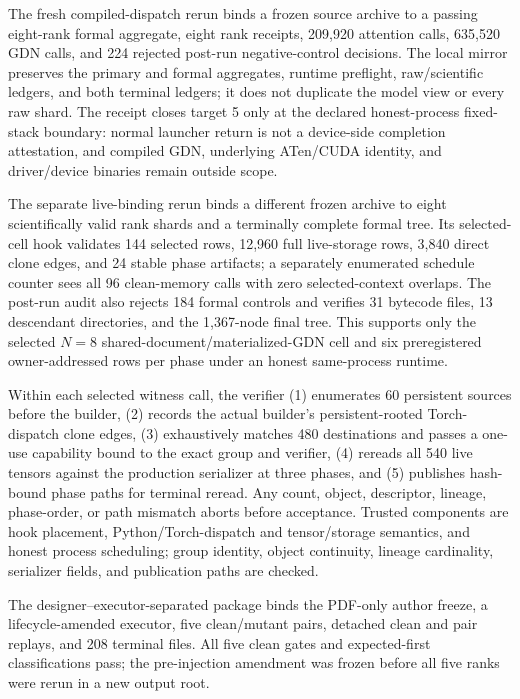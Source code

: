 \documentclass{article}
\begin{document}
The fresh compiled-dispatch rerun binds a frozen source archive to a passing
eight-rank formal aggregate, eight rank receipts, 209,920 attention calls,
635,520 GDN calls, and 224 rejected post-run negative-control decisions.  The
local mirror preserves the primary and formal aggregates, runtime preflight,
raw/scientific ledgers, and both terminal ledgers; it does not duplicate the
model view or every raw shard.  The receipt closes target 5 only at the
declared honest-process fixed-stack boundary: normal launcher return is not a
device-side completion attestation, and compiled GDN, underlying ATen/CUDA
identity, and driver/device binaries remain outside scope.

The separate live-binding rerun binds a different frozen archive to eight
scientifically valid rank shards and a terminally complete formal tree.  Its
selected-cell hook validates 144 selected rows, 12,960 full live-storage rows,
3,840 direct clone edges, and 24 stable phase artifacts; a separately enumerated
schedule counter sees all 96 clean-memory calls with zero selected-context
overlaps.  The
post-run audit also rejects 184 formal controls and verifies 31 bytecode files,
13 descendant directories, and the 1,367-node final tree.  This supports only
the selected $N=8$ shared-document/materialized-GDN cell and six preregistered
owner-addressed rows per phase under an honest same-process runtime.

Within each selected witness call, the verifier (1) enumerates 60 persistent
sources before the builder, (2) records the actual builder's persistent-rooted
Torch-dispatch clone edges, (3) exhaustively matches 480 destinations and passes
a one-use capability bound to the exact group and verifier, (4) rereads all 540
live tensors against the production serializer at three phases, and (5)
publishes hash-bound phase paths for terminal reread.  Any count, object,
descriptor, lineage, phase-order, or path mismatch aborts before acceptance.
Trusted components are hook placement, Python/Torch-dispatch and tensor/storage
semantics, and honest process scheduling; group identity, object continuity,
lineage cardinality, serializer fields, and publication paths are checked.

The designer--executor-separated package binds the PDF-only author freeze, a
lifecycle-amended executor, five clean/mutant pairs, detached clean and pair
replays, and 208 terminal files.  All five clean gates and expected-first
classifications pass; the pre-injection amendment was frozen before all five
ranks were rerun in a new output root.
\end{document}
